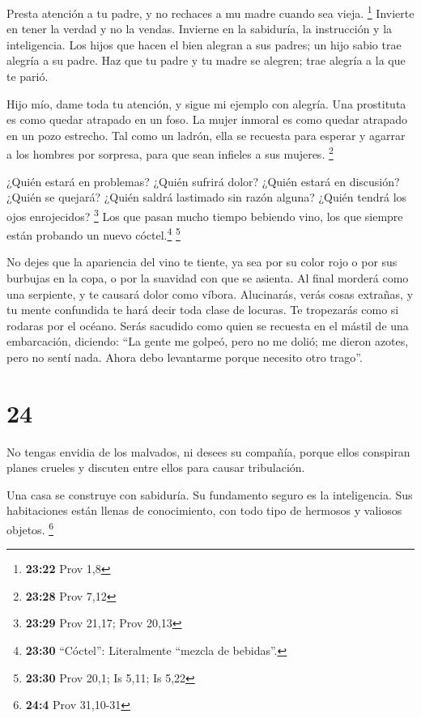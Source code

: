  Presta atención a tu padre, y no rechaces a mu madre
cuando sea vieja. \footnote{\textbf{23:22} Prov 1,8} 
Invierte en tener la verdad y no la vendas. Invierne en la sabiduría, la
instrucción y la inteligencia.  Los hijos que hacen el
bien alegran a sus padres; un hijo sabio trae alegría a su padre.
 Haz que tu padre y tu madre se alegren; trae alegría a
la que te parió.

 Hijo mío, dame toda tu atención, y sigue mi ejemplo con
alegría.  Una prostituta es como quedar atrapado en un
foso. La mujer inmoral es como quedar atrapado en un pozo estrecho.
 Tal como un ladrón, ella se recuesta para esperar y
agarrar a los hombres por sorpresa, para que sean infieles a sus
mujeres. \footnote{\textbf{23:28} Prov 7,12}

 ¿Quién estará en problemas? ¿Quién sufrirá dolor? ¿Quién
estará en discusión? ¿Quién se quejará? ¿Quién saldrá lastimado sin
razón alguna? ¿Quién tendrá los ojos enrojecidos? \footnote{\textbf{23:29}
  Prov 21,17; Prov 20,13}  Los que pasan mucho tiempo
bebiendo vino, los que siempre están probando un nuevo
cóctel.\footnote{\textbf{23:30} ``Cóctel'': Literalmente ``mezcla de
  bebidas''.} \footnote{\textbf{23:30} Prov 20,1; Is 5,11; Is 5,22}

 No dejes que la apariencia del vino te tiente, ya sea
por su color rojo o por sus burbujas en la copa, o por la suavidad con
que se asienta.  Al final morderá como una serpiente, y
te causará dolor como víbora.  Alucinarás, verás cosas
extrañas, y tu mente confundida te hará decir toda clase de locuras.
 Te tropezarás como si rodaras por el océano. Serás
sacudido como quien se recuesta en el mástil de una embarcación,
diciendo:  ``La gente me golpeó, pero no me dolió; me
dieron azotes, pero no sentí nada. Ahora debo levantarme porque necesito
otro trago''.

\hypertarget{section-23}{%
\section{24}\label{section-23}}

 No tengas envidia de los malvados, ni desees su compañía,
 porque ellos conspiran planes crueles y discuten entre
ellos para causar tribulación.

 Una casa se construye con sabiduría. Su fundamento seguro
es la inteligencia.  Sus habitaciones están llenas de
conocimiento, con todo tipo de hermosos y valiosos objetos. \footnote{\textbf{24:4}
  Prov 31,10-31}

